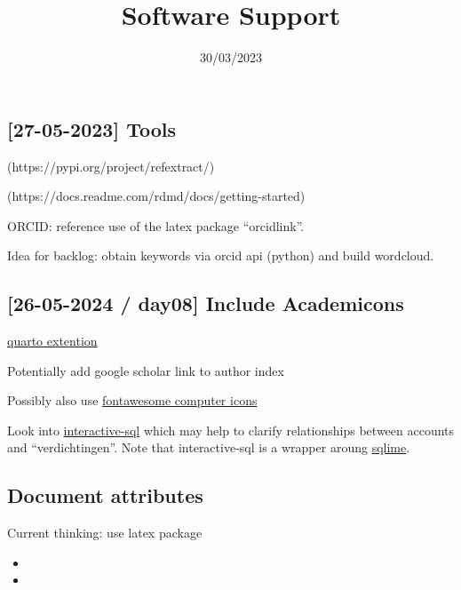 \documentclass[
  letterpaper,
  DIV=11,
  numbers=noendperiod]{scrartcl}
\title{Software Support}
\author{}
\date{30/03/2023}
\begin{document}
\maketitle
\ifdefined\Shaded\renewenvironment{Shaded}{\begin{tcolorbox}[borderline west={3pt}{0pt}{shadecolor}, enhanced, boxrule=0pt, interior hidden, sharp corners, frame hidden, breakable]}{\end{tcolorbox}}\fi

\hypertarget{tools}{%
\subsection{{[}27-05-2023{]} Tools}\label{tools}}

(https://pypi.org/project/refextract/)

(https://docs.readme.com/rdmd/docs/getting-started)

ORCID: reference use of the latex package ``orcidlink''.

Idea for backlog: obtain keywords via orcid api (python) and build
wordcloud.

\hypertarget{day08-include-academicons}{%
\subsection{{[}26-05-2024 / day08{]} Include
Academicons}\label{day08-include-academicons}}

\href{https://schochastics.quarto.pub/academicons-quarto-extension/}{quarto
extention}

Potentially add google scholar link to author index

Possibly also use
\href{https://www.w3schools.com/icons/fontawesome5_icons_computers.asp}{fontawesome
computer icons}

Look into
\href{https://shafayetshafee.github.io/interactive-sql/example.html}{interactive-sql}
which may help to clarify relationships between accounts and
``verdichtingen''. Note that interactive-sql is a wrapper aroung
\href{https://sqlime.org/about.html}{sqlime}.

\hypertarget{document-attributes}{%
\subsection{Document attributes}\label{document-attributes}}

Current thinking: use latex package

\begin{itemize}
\item
\item
\end{itemize}
\end{document}
